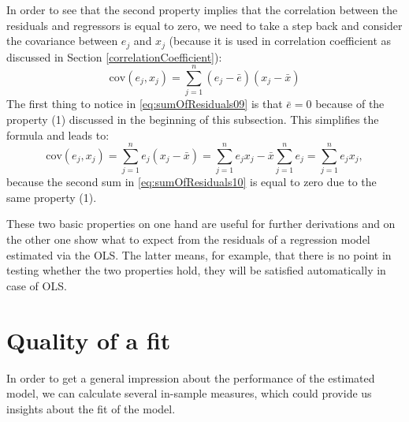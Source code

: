 \documentclass[
]{book}
\theoremstyle{definition}
\theoremstyle{definition}
\theoremstyle{definition}
\theoremstyle{definition}
\theoremstyle{remark}
\begin{document}
In order to see that the second property implies that the correlation between the residuals and regressors is equal to zero, we need to take a step back and consider the covariance between \(e_j\) and \(x_j\) (because it is used in correlation coefficient as discussed in Section \ref{correlationCoefficient}):
\begin{equation}
    \mathrm{cov}(e_j,x_j) = \sum_{j=1}^n (e_j - \bar{e})(x_j - \bar{x})
    \label{eq:sumOfResiduals09}
\end{equation}
The first thing to notice in \eqref{eq:sumOfResiduals09} is that \(\bar{e}=0\) because of the property (1) discussed in the beginning of this subsection. This simplifies the formula and leads to:
\begin{equation}
    \mathrm{cov}(e_j,x_j) = \sum_{j=1}^n e_j (x_j - \bar{x}) = \sum_{j=1}^n e_j x_j - \bar{x} \sum_{j=1}^n e_j = \sum_{j=1}^n e_j x_j ,
    \label{eq:sumOfResiduals10}
\end{equation}
because the second sum in \eqref{eq:sumOfResiduals10} is equal to zero due to the same property (1).

These two basic properties on one hand are useful for further derivations and on the other one show what to expect from the residuals of a regression model estimated via the OLS. The latter means, for example, that there is no point in testing whether the two properties hold, they will be satisfied automatically in case of OLS.

\hypertarget{linearRegressionSimpleQualityOfFit}{%
\section{Quality of a fit}\label{linearRegressionSimpleQualityOfFit}}

In order to get a general impression about the performance of the estimated model, we can calculate several in-sample measures, which could provide us insights about the fit of the model.
\end{document}
